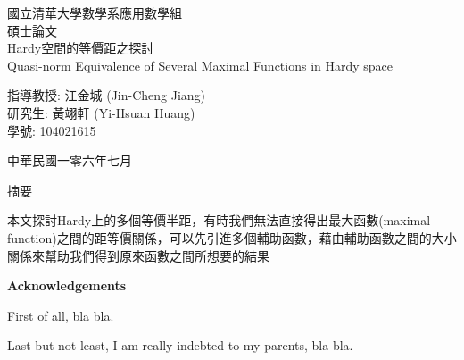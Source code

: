 \documentclass[12pt]{article}  %
\numberwithin{equation}{subsection}
\theoremstyle{plain}
\begin{document}

\begin{titlepage}  %
\begin{center}
\huge 國立清華大學數學系應用數學組\\
\huge 碩士論文\\
\vspace*{15ex}
\huge Hardy空間的等價距之探討\\
\huge Quasi-norm Equivalence of Several Maximal Functions in Hardy space\\
\vspace*{10ex}

\begin{flushleft}
	\hspace{2cm}\LARGE 指導教授: 江金城 (Jin-Cheng Jiang)\\
	\hspace{2cm}\LARGE 研究生: 黃翊軒 (Yi-Hsuan Huang)\\
	\hspace{2cm}\LARGE 學號: 104021615\\
	\vspace*{3ex}
	
\end{flushleft}
\LARGE 中華民國一零六年七月
\end{center}
\end{titlepage}

\begin{center}
	\LARGE 摘要
\end{center}
本文探討Hardy上的多個等價半距，有時我們無法直接得出最大函數(maximal function)之間的距等價關係，可以先引進多個輔助函數，藉由輔助函數之間的大小關係來幫助我們得到原來函數之間所想要的結果
\newpage  %

\begin{abstract}  %
This thesis consists of two parts. In the first part, bla bla.

In the second part, bla bla.
\end{abstract}
\newpage  %

\begin{center}
\textbf{Acknowledgements}  %
\end{center}
{\small

First of all, bla bla.

Last but not least, I am really indebted to my parents, bla bla.
}
\newpage
\end{document}
